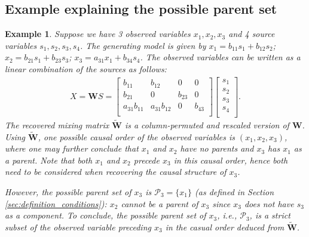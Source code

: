 \documentclass[12pt]{article}
\newtheorem{example}{Example}
\newcommand{\bW}{\mathbf{W}}
\begin{document}
\subsection{Example explaining the possible parent set}\label{app:possible_parent_set_example}
\begin{example}
Suppose we have 3 observed variables $x_1,x_2,x_3$ and 4 source variables $s_1,s_2,s_3,s_4$. The generating model is given by $x_1=b_{11} s_1+ b_{12} s_2$; $x_2=b_{21} s_1 +b_{23} s_3$; $x_3=a_{31} x_1+b_{34}s_4$. The observed variables can be written as a linear combination of the sources as follows:
\begin{align}\nonumber
X =\bW S=
\begin{bmatrix}
b_{11} & b_{12} & 0 & 0 \\
b_{21} & 0 & b_{23} & 0 \\
a_{31}b_{11} & a_{31}b_{12} & 0 & b_{43} \\
\end{bmatrix}
\begin{bmatrix}
s_1 \\
s_2 \\
s_3 \\
s_4 \\
\end{bmatrix}.
\end{align}
The recovered mixing matrix $\tilde{\bW}$ is a column-permuted and rescaled version of $\bW$. Using $\tilde{\bW}$, one possible causal order of the observed variables is $(x_1,x_2,x_3)$, where 
one may further conclude that 
$x_1$ and $x_2$ have no parents and $x_3$ has $x_1$ as a parent. Note that both $x_1$ and $x_2$ precede $x_3$ in this causal order, 
hence both need to be considered when recovering the causal structure of $x_3$. 

However, the possible parent set of $x_3$ is $\mathcal{P}_3=\{x_1\}$ (as defined in Section \ref{sec:definition_conditions}): $x_2$ cannot be a parent of $x_3$ since $x_3$ does not have $s_3$ as a component. To conclude, the possible parent set of $x_3$, i.e., $\mathcal{P}_3$, is a strict subset of the observed variable preceding $x_3$ in the casual order deduced from $\tilde{\bW}$.
\end{example}
\end{document}
